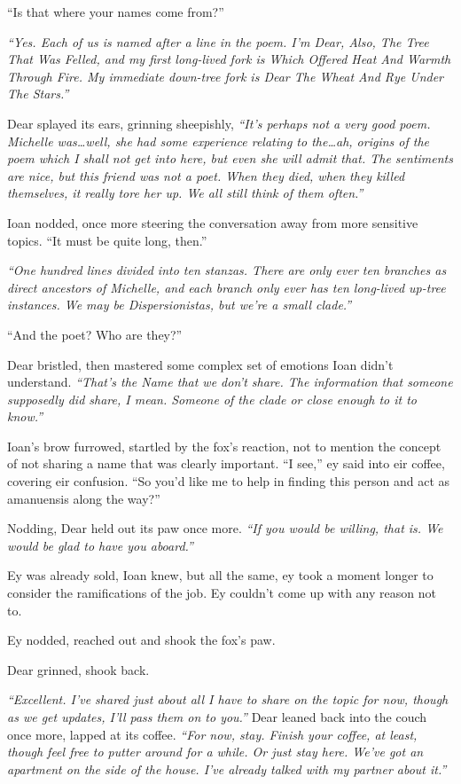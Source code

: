 ``Is that where your names come from?''

\emph{``Yes. Each of us is named after a line in the poem. I'm Dear, Also, The Tree That Was Felled, and my first long-lived fork is Which Offered Heat And Warmth Through Fire. My immediate down-tree fork is Dear The Wheat And Rye Under The Stars.''}

Dear splayed its ears, grinning sheepishly, \emph{``It's perhaps not a very good poem. Michelle was\ldots{}well, she had some experience relating to the\ldots{}ah, origins of the poem which I shall not get into here, but even she will admit that. The sentiments are nice, but this friend was not a poet. When they died, when they killed themselves, it really tore her up. We all still think of them often.''}

Ioan nodded, once more steering the conversation away from more sensitive topics. ``It must be quite long, then.''

\emph{``One hundred lines divided into ten stanzas. There are only ever ten branches as direct ancestors of Michelle, and each branch only ever has ten long-lived up-tree instances. We may be Dispersionistas, but we're a small clade.''}

``And the poet? Who are they?''

Dear bristled, then mastered some complex set of emotions Ioan didn't understand. \emph{``That's the Name that we don't share. The information that someone supposedly did share, I mean. Someone of the clade or close enough to it to know.''}

Ioan's brow furrowed, startled by the fox's reaction, not to mention the concept of not sharing a name that was clearly important. ``I see,'' ey said into eir coffee, covering eir confusion. ``So you'd like me to help in finding this person and act as amanuensis along the way?''

Nodding, Dear held out its paw once more. \emph{``If you would be willing, that is. We would be glad to have you aboard.''}

Ey was already sold, Ioan knew, but all the same, ey took a moment longer to consider the ramifications of the job. Ey couldn't come up with any reason not to.

Ey nodded, reached out and shook the fox's paw.

Dear grinned, shook back.

\emph{``Excellent. I've shared just about all I have to share on the topic for now, though as we get updates, I'll pass them on to you.''} Dear leaned back into the couch once more, lapped at its coffee. \emph{``For now, stay. Finish your coffee, at least, though feel free to putter around for a while. Or just stay here. We've got an apartment on the side of the house. I've already talked with my partner about it.''}

